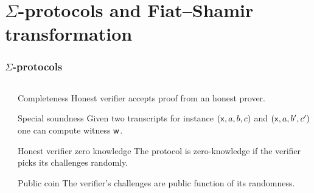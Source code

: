\documentclass[aspectratio=169,handout]{beamer}
\begin{document}
\section*{$\Sigma$-protocols and Fiat--Shamir transformation}
\begin{frame}
  \frametitle{$\Sigma$-protocols}
  \begin{columns}
    \begin{column}{.3\linewidth}
    \end{column}
    \begin{column}{.6\linewidth}
      \begin{block}{Completeness}
        Honest verifier accepts proof from an honest prover.
      \end{block}
      \begin{block}{Special soundness}
        Given two transcripts for instance $(\mathsf{x}, a, b, c)$ and
        $(\mathsf{x}, a, b', c')$ one can compute witness $\mathsf{w}$.
      \end{block}
      \begin{block}{Honest verifier zero knowledge}
        The protocol is zero-knowledge if the verifier picks its challenges randomly.
      \end{block}
      \begin{block}{Public coin}
        The verifier's challenges are public function of its randomness.
      \end{block}
    \end{column}
  \end{columns}
\end{frame}
\end{document}
